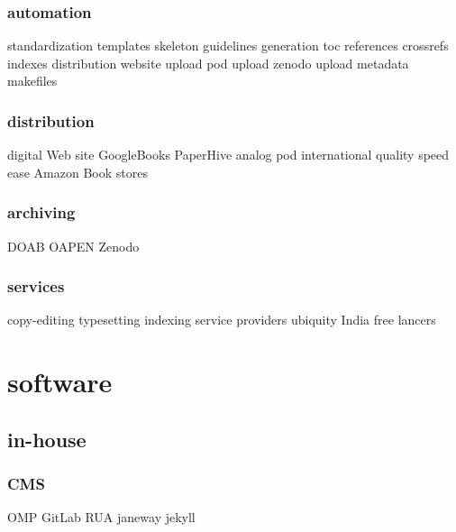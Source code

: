 \documentclass[output=guidelines,guidelines] {langscibook}
\begin{document}
\subsubsection{automation}
                    standardization
                        templates
                        skeleton
                        guidelines
                    generation
                        toc
                        references
                        crossrefs
                        indexes
                    distribution
                        website upload
                        pod upload
                        zenodo upload
                    metadata
                    makefiles
\subsubsection{distribution}
                    digital
                        Web site
                        GoogleBooks
                        PaperHive
                    analog
                        pod
                            international
                            quality
                            speed
                            ease
                        Amazon
                        Book stores
\subsubsection{archiving}
                    DOAB
                    OAPEN
                    Zenodo
\subsubsection{services}
                    copy-editing
                    typesetting
                    indexing
                    service providers
                        ubiquity
                        India
                        free lancers
\section{software}
\subsection{in-house}
\subsubsection{CMS}
                    OMP
                    GitLab
                    RUA
                    janeway
                    jekyll
\end{document}

